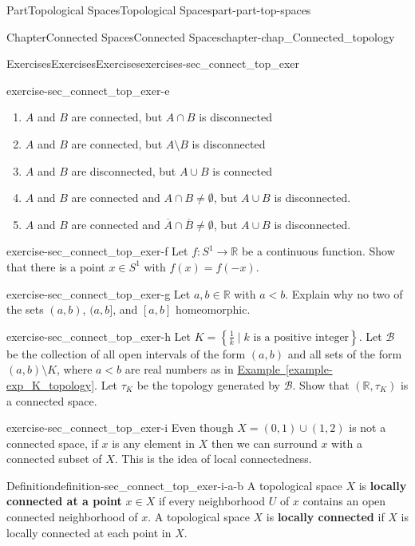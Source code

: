 \documentclass[oneside,10pt,]{book}
\newcommand{\xreffont}{\relax}
\newcommand{\terminology}[1]{\textbf{#1}}
\numberwithin{equation}{chapter}
\newcommand{\R}{\mathbb{R}}
\newcommand{\B}{\mathcal{B}}
\newcommand{\lt}{<}
\begin{document}
\begin{partptx}{Part}{Topological Spaces}{}{Topological Spaces}{}{}{part-part-top-spaces}
\begin{chapterptx}{Chapter}{Connected Spaces}{}{Connected Spaces}{}{}{chapter-chap_Connected_topology}
\begin{exercises-section}{Exercises}{Exercises}{}{Exercises}{}{}{exercises-sec_connect_top_exer}
\begin{divisionexercise}{5}{}{}{exercise-sec_connect_top_exer-e}
\begin{enumerate}[font=\bfseries,label=(\alph*),ref=\alph*]%
\item{}\(A\) and \(B\) are connected, but \(A \cap B\) is disconnected%
\item{}\(A\) and \(B\) are connected, but \(A \setminus B\) is disconnected%
\item{}\(A\) and \(B\) are disconnected, but \(A \cup B\) is connected%
\item{}\(A\) and \(B\) are connected and \(A \cap B \neq \emptyset\), but \(A \cup B\) is disconnected.%
\item{}\(A\) and \(B\) are connected and \(\overline{A} \cap \overline{B} \neq \emptyset\), but \(A \cup B\) is disconnected.%
\end{enumerate}%
\end{divisionexercise}%
\begin{divisionexercise}{6}{}{}{exercise-sec_connect_top_exer-f}%
Let \(f: S^1 \to \R\) be a continuous function. Show that there is a point \(x \in S^1\) with \(f(x) = f(-x)\).%
\end{divisionexercise}%
\begin{divisionexercise}{7}{}{}{exercise-sec_connect_top_exer-g}%
Let \(a, b \in \R\) with \(a \lt b\). Explain why no two of the sets \((a,b)\), \((a,b]\), and \([a,b]\) homeomorphic.%
\end{divisionexercise}%
\begin{divisionexercise}{8}{}{}{exercise-sec_connect_top_exer-h}%
Let  \(K = \left\{\frac{1}{k} \mid k \text{ is a positive integer} \right\}\). Let \(\B\) be the collection of all open intervals of the form \((a,b)\) and all sets of the form \((a,b) \setminus K\), where \(a \lt b\) are real numbers as in \hyperref[example-exp_K_topology]{Example~{\xreffont\ref{example-exp_K_topology}}}. Let \(\tau_K\) be the topology generated by \(\B\). Show that \((\R, \tau_K)\) is a connected space.%
\end{divisionexercise}%
\begin{divisionexercise}{9}{}{}{exercise-sec_connect_top_exer-i}%
Even though \(X = (0,1) \cup (1,2)\) is not a connected space, if \(x\) is any element in \(X\) then we can surround \(x\) with a connected subset of \(X\). This is the idea of local connectedness.%
\begin{definition}{Definition}{}{definition-sec_connect_top_exer-i-a-b}%
%
A topological space \(X\) is \terminology{locally connected at a point} \(x \in X\) if every neighborhood \(U\) of \(x\) contains an open connected neighborhood of \(x\). A topological space \(X\) is \terminology{locally connected} if \(X\) is locally connected at each point in \(X\).%

\end{definition}
\end{divisionexercise}
\end{exercises-section}
\end{chapterptx}
\end{partptx}
\end{document}
